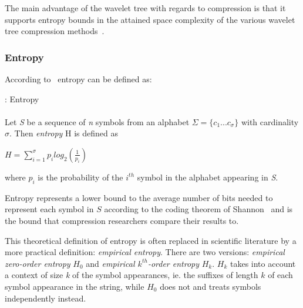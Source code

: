 The main advantage of the wavelet tree with regards to compression is that it supports entropy bounds in the attained space complexity of the various wavelet tree compression methods~.

\subsubsection{Entropy}
According to~ entropy can be defined as:

\begin{mdframed}[nobreak, linecolor=lightgray, linewidth=2pt]
\begin{definition}: Entropy \\\\
Let \textit{S} be a sequence of \textit{n} symbols from an alphabet $\Sigma = \lbrace c_1 ... c_\sigma \rbrace$ with cardinality $\sigma$.
Then \textit{entropy} H is defined as
\begin{center}
$H = \sum_{i=1}^{\sigma} p_i log_2(\frac{1}{p_i})$
\end{center}
where $p_i$ is the probability of the $i^{th}$ symbol in the alphabet appearing in \textit{S}.
\end{definition} 
\end{mdframed}

Entropy represents a lower bound to the average number of bits needed to represent each symbol in $S$ according to the coding theorem of Shannon~ and is the bound that compression researchers compare their results to.

This theoretical definition of entropy is often replaced in scientific literature by a more practical definition: \textit{empirical entropy}.
There are two versions: \textit{empirical zero-order entropy} $H_0$ and \textit{empirical $k^{th}$-order entropy} $H_k$. $H_k$ takes into account a context of size \textit{k} of the symbol appearances, ie. the suffixes of length $k$ of each symbol appearance in the string, while $H_0$ does not and treats symbols independently instead. 

